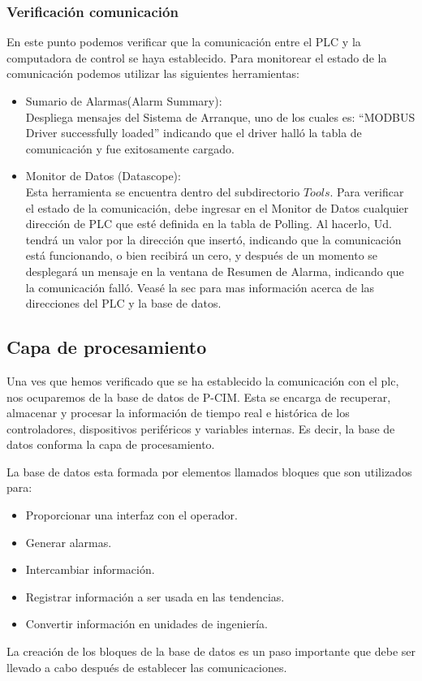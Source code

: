 \subsubsection{Verificación comunicación}
En este punto podemos verificar que la comunicación entre el PLC y la
computadora de control se haya establecido. Para monitorear el estado 
de la comunicación podemos utilizar las siguientes herramientas:
\begin{itemize}
 \item Sumario de Alarmas(Alarm Summary):\\
  Despliega mensajes del Sistema de Arranque, uno de los cuales es: “MODBUS
  Driver successfully loaded” indicando que el driver halló la tabla de 
  comunicación y fue exitosamente cargado.
 \item Monitor de Datos (Datascope):\\
  Esta herramienta se encuentra dentro del subdirectorio $Tools$.
  Para verificar el estado de la comunicación,
  debe ingresar en el Monitor de Datos cualquier dirección de PLC que esté 
  definida en la tabla de Polling. Al hacerlo, Ud. tendrá un valor por la 
  dirección que insertó,
  indicando que la comunicación está funcionando, o bien recibirá un cero, y
  después de un momento se desplegará un mensaje en la ventana de Resumen
  de Alarma, indicando que la comunicación falló. Veasé la sec
  para mas información acerca de las direcciones del PLC y la base de 
  datos.
\end{itemize}


\subsection{Capa de procesamiento}
\label{subsec:CapaProcesamiento}
Una ves que hemos verificado que se ha establecido la comunicación con el 
\gls{plc}, nos ocuparemos de la base de datos de P-CIM. Esta se encarga de 
recuperar, almacenar y procesar la información de tiempo real e histórica de los 
controladores, dispositivos periféricos y variables internas. Es decir, la base 
de datos conforma la capa de procesamiento.

La base de datos esta formada por elementos llamados bloques que son utilizados 
para:
\begin{itemize}
 \item Proporcionar una interfaz con el operador.
 \item Generar alarmas.
 \item Intercambiar información.
 \item Registrar información a ser usada en las tendencias.
 \item Convertir información en unidades de ingeniería.
\end{itemize}
La creación de los bloques de la base de datos es un paso importante que 
debe ser llevado a cabo después de establecer las comunicaciones.


